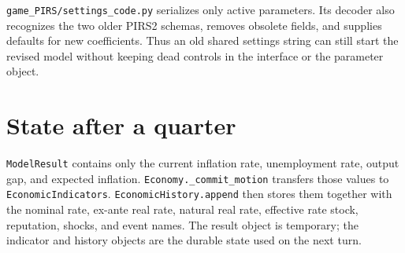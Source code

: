 \documentclass[11pt]{article}
\newcommand{\code}[1]{\texttt{#1}}
\newcommand{\file}[1]{\texttt{game\_PIRS/#1}}
\begin{document}
\file{settings\_code.py} serializes only active parameters.  Its decoder also
recognizes the two older PIRS2 schemas, removes obsolete fields, and supplies
defaults for new coefficients.  Thus an old
shared settings string can still start the revised model without keeping dead
controls in the interface or the parameter object.

\section{State after a quarter}

\code{ModelResult} contains only the current inflation rate, unemployment rate,
output gap, and expected inflation.  \code{Economy.\_commit\_motion} transfers
those values to \code{EconomicIndicators}.  \code{EconomicHistory.append}
then stores them together with the nominal rate, ex-ante real rate, natural real
rate, effective rate stock, reputation, shocks, and event names.  The result
object is temporary; the indicator and history objects are the durable state
used on the next turn.
\end{document}
